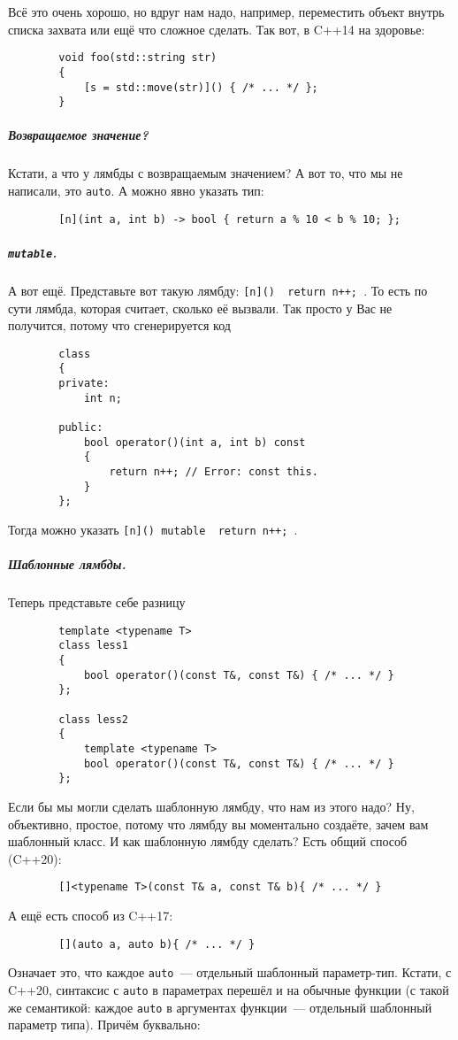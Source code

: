 \documentclass{article}
\begin{document}
    Всё это очень хорошо, но вдруг нам надо, например, переместить объект внутрь списка захвата или ещё что сложное сделать. Так вот, в C++14 на здоровье:
    \begin{verbatim}
        void foo(std::string str)
        {
            [s = std::move(str)]() { /* ... */ };
        }
    \end{verbatim}
    \subparagraph{Возвращаемое значение?}
    Кстати, а что у лямбды с возвращаемым значением? А вот то, что мы не написали, это \texttt{auto}. А можно явно указать тип:
    \begin{verbatim}
        [n](int a, int b) -> bool { return a % 10 < b % 10; };
    \end{verbatim}
    \subparagraph{\texttt{mutable}.}
    А вот ещё. Представьте вот такую лямбду: \texttt{[n]() { return n++; }}. То есть по сути лямбда, которая считает, сколько её вызвали. Так просто у Вас не получится, потому что сгенерируется код
    \begin{verbatim}
        class
        {
        private:
            int n;
            
        public:
            bool operator()(int a, int b) const
            {
                return n++; // Error: const this.
            }
        };
    \end{verbatim}
    Тогда можно указать \texttt{[n]() mutable { return n++; }}.
    \subparagraph{Шаблонные лямбды.}
    Теперь представьте себе разницу
    \begin{verbatim}
        template <typename T>
        class less1
        {
            bool operator()(const T&, const T&) { /* ... */ }
        };

        class less2
        {
            template <typename T>
            bool operator()(const T&, const T&) { /* ... */ }
        };
    \end{verbatim}
    Если бы мы могли сделать шаблонную лямбду, что нам из этого надо? Ну, объективно, простое, потому что лямбду вы моментально создаёте, зачем вам шаблонный класс. И как шаблонную лямбду сделать? Есть общий способ (C++20):
    \begin{verbatim}
        []<typename T>(const T& a, const T& b){ /* ... */ }
    \end{verbatim}
    А ещё есть способ из C++17:
    \begin{verbatim}
        [](auto a, auto b){ /* ... */ }
    \end{verbatim}
    Означает это, что каждое \texttt{auto}~--- отдельный шаблонный параметр-тип. Кстати, с C++20, синтаксис с \texttt{auto} в параметрах перешёл и на обычные функции (с такой же семантикой: каждое \texttt{auto} в аргументах функции~--- отдельный шаблонный параметр типа). Причём буквально:
\end{document}
